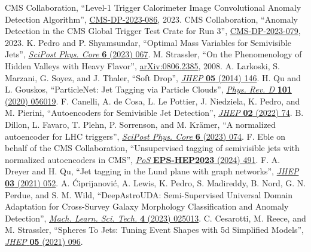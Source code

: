 \begin{thebibliography}{99}
 CMS Collaboration, ``Level-1 Trigger Calorimeter Image Convolutional Anomaly Detection Algorithm'', \href{http://cds.cern.ch/record/2879816}{CMS-DP-2023-086}, 2023.
 CMS Collaboration, ``Anomaly Detection in the CMS Global Trigger Test Crate for Run 3'', \href{http://cds.cern.ch/record/2876546}{CMS-DP-2023-079}, 2023.
 K. Pedro and P. Shyamsundar, ``Optimal Mass Variables for Semivisible Jets'', \href{https://doi.org/10.21468/SciPostPhysCore.6.4.067}{\textit{SciPost Phys. Core} \textbf{6} (2023) 067}.
 M. Strassler, ``On the Phenomenology of Hidden Valleys with Heavy Flavor'', \href{https://arxiv.org/abs/0806.2385}{arXiv:0806.2385}, 2008.
 A. Larkoski, S. Marzani, G. Soyez, and J. Thaler, ``Soft Drop'', \href{https://doi.org/10.1007/JHEP05(2014)146}{\textit{JHEP} \textbf{05} (2014) 146}.
 H. Qu and L. Gouskos, ``ParticleNet: Jet Tagging via Particle Clouds'', \href{https://doi.org/10.1103/PhysRevD.101.056019}{\textit{Phys. Rev. D} \textbf{101} (2020) 056019}.
 F. Canelli, A. de Cosa, L. Le Pottier, J. Niedziela, K. Pedro, and M. Pierini, ``Autoencoders for Semivisible Jet Detection'', \href{https://doi.org/10.1007/JHEP02(2022)074}{\textit{JHEP} \textbf{02} (2022) 74}.
 B. Dillon, L. Favaro, T. Plehn, P. Sorrenson, and M. Kr\"amer, ``A normalized autoencoder for LHC triggers'', \href{https://doi.org/10.21468/SciPostPhysCore.6.4.074}{\textit{SciPost Phys. Core} \textbf{6} (2023) 074}.
 F. Eble on behalf of the CMS Collaboration, ``Unsupervised tagging of semivisible jets with normalized autoencoders in CMS'', \href{https://doi.org/10.22323/1.449.0491}{\textit{PoS} \textbf{EPS-HEP2023} (2024) 491}.
 F. A. Dreyer and H. Qu, ``Jet tagging in the Lund plane with graph networks'', \href{https://doi.org/10.1007/JHEP03(2021)052}{\textit{JHEP} \textbf{03} (2021) 052}.
 A. \'Ciprijanovi\'c, A. Lewis, K. Pedro, S. Madireddy, B. Nord, G. N. Perdue, and S. M. Wild, ``DeepAstroUDA: Semi-Supervised Universal Domain Adaptation for Cross-Survey Galaxy Morphology Classification and Anomaly Detection'', \href{https://doi.org/10.1088/2632-2153/acca5f}{\textit{Mach. Learn. Sci. Tech.} \textbf{4} (2023) 025013}.
 C. Cesarotti, M. Reece, and M. Strassler, ``Spheres To Jets: Tuning Event Shapes with 5d Simplified Models'', \href{https://doi.org/10.1007/JHEP05(2021)096}{\textit{JHEP} \textbf{05} (2021) 096}.

\end{thebibliography}

